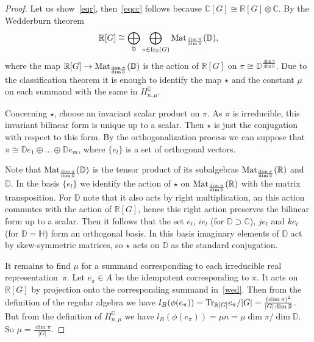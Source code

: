 \documentclass[pdftex]{sigma}
\def \R {{\mathbb R}}
\def \C {{\mathbb C}}
\def \H {{\mathbb H}}
\def \mat {{\rm Mat}}
\begin{document}
\begin{proof} Let us show~\eqref{eqr}, then~\eqref{eqcc} follows
because
$\C[G] \cong \R[G] \otimes \C$.
 By the Wedderburn theorem
\begin{gather}\label{wed}
\R[G] \cong \bigoplus_{\mathbb D}
\bigoplus_{\pi \in {\rm Ir}_\mathbb{D}(G)} \mat_{\frac{\dim\pi}{\dim\mathbb{D}}}(\mathbb{D}),
\end{gather}
where the map $\R[G] \to  \mat_{\frac{\dim\pi}{\dim\mathbb{D}}} (\mathbb{D})$ is the action of $\R[G]$ on
$\pi \cong \mathbb{D}^{\frac{\dim\pi}{\dim\mathbb{D}}}$.  Due to the classif\/ication theorem it is enough
to identify the map $\star$ and the constant $\mu$ on each summand with the same in
$H^\mathbb{D}_{n, \mu}$.


Concerning $\star$, choose an invariant scalar product on $\pi$. As $\pi$ is irreducible,
this invariant bilinear form is unique up to a scalar. Then $\star$ is just the conjugation
with respect to this form. By the orthogonalization process we can suppose that
$\pi \cong\mathbb{D}e_1 \oplus \dots \oplus\mathbb{D} e_m$, where $\{e_l\}$ is a  set of orthogonal vectors.

Note that  $\mat_{\frac{\dim \pi}{\dim\mathbb{D}}}(\mathbb{D})$ is the tensor product
of its subalgebras  $\mat_{\frac{\dim\pi}{\dim\mathbb{D}}}(\mathbb{R})$ and $\mathbb{D}$. In the basis $\{e_l\}$
we identify the action of $\star$ on  $\mat_{\frac{\dim\pi}{\dim\mathbb{D}}}(\R)$ with the matrix transposition.
For $\mathbb{D}$ note that it also acts by right multiplication, an this action commutes with the action of
$\R[G]$, hence this right action preserves the bilinear form up to a scalar. Then it
follows that the set $e_l$, $ie_l$ (for $\mathbb{D}\supset \C$), $je_l$ and $ke_l$ (for $\mathbb{D}=\H$)
form an orthogonal basis. In this basis imaginary elements of $\mathbb{D}$ act by skew-symmetric matrices,
so $\star$ acts on $\mathbb{D}$ as the standard conjugation.

It remains to f\/ind $\mu$ for a summand corresponding to each irreducible real representation~$\pi$.
Let $e_\pi\in A$ be the idempotent corresponding to $\pi$. It acts on
$\R[G]$ by projection onto the corresponding summand in~\eqref{wed}. Then
from the def\/inition
of the regular algebra we have $l_B(\phi(e_\pi)) = {\rm Tr}_{\R[G]} e_\pi /|G|
= \frac{(\dim \pi)^2}{|G|\dim {\mathbb D}}$.
But from the def\/inition of $H^{\mathbb D}_{n,\mu}$ we have
$l_B(\phi(e_\pi)) = \mu n = \mu  \dim \pi/ \dim {\mathbb D}$.
So $\mu = \frac{\dim \pi}{|G|}$.
\end{proof}
\end{document}
